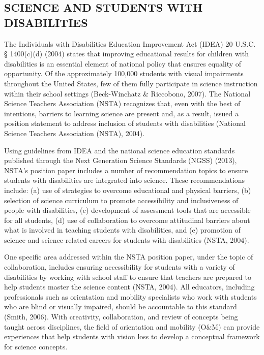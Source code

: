 \documentclass[11.5pt]{sig-alternate} %
\begin{document}
\begin{large}
\section*{SCIENCE AND STUDENTS WITH DISABILITIES}

The Individuals with Disabilities Education Improvement Act (IDEA) 20 U.S.C. § 1400(c)(d) (2004) states that improving educational results for children with disabilities is an essential element of national policy that ensures equality of opportunity.  Of the approximately 100,000 students with visual impairments throughout the United States, few of them fully participate in science instruction within their school settings (Beck-Winchatz \& Riccobono, 2007).  The National Science Teachers Association (NSTA) recognizes that, even with the best of intentions, barriers to learning science are present and, as a result, issued a position statement to address inclusion of students with disabilities (National Science Teachers Association (NSTA), 2004).

Using guidelines from IDEA and the national science education standards published through the Next Generation Science Standards (NGSS) (2013), NSTA’s position paper includes a number of recommendation topics to ensure students with disabilities are integrated into science. These recommendations include:  (a) use of strategies to overcome educational and physical barriers, (b) selection of science curriculum to promote accessibility and inclusiveness of people with disabilities, (c) development of assessment tools that are accessible for all students, (d) use of collaboration to overcome attitudinal barriers about what is involved in teaching students with disabilities, and (e) promotion of science and science-related careers for students with disabilities (NSTA, 2004).

One specific area addressed within the NSTA position paper, under the topic of collaboration, includes ensuring accessibility for students with a variety of disabilities by working with school staff to ensure that teachers are prepared to help students master the science content (NSTA, 2004).  All educators, including professionals such as orientation and mobility specialists who work with students who are blind or visually impaired, should be accountable to this standard (Smith, 2006).  With creativity, collaboration, and review of concepts being taught across disciplines, the field of orientation and mobility (O\&M) can provide experiences that help students with vision loss to develop a conceptual framework for science concepts.


\end{large}
\end{document}
